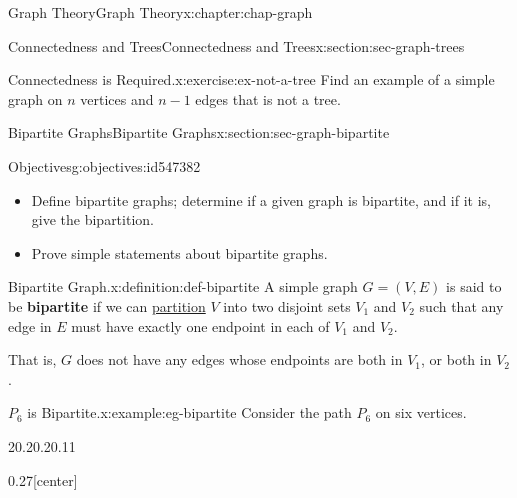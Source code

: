\documentclass[oneside,10pt,]{book}
\newcommand{\terminology}[1]{\textbf{#1}}
\numberwithin{equation}{section}
\begin{document}
\begin{chapterptx}{Graph Theory}{}{Graph Theory}{}{}{x:chapter:chap-graph}
\begin{sectionptx}{Connectedness and Trees}{}{Connectedness and Trees}{}{}{x:section:sec-graph-trees}
\begin{inlineexercise}{Connectedness is Required.}{x:exercise:ex-not-a-tree}
Find an example of a simple graph on \(n\) vertices and \(n-1\) edges that is not a tree.%
\end{inlineexercise}%
\end{sectionptx}
%
%
\typeout{************************************************}
\typeout{************************************************}
%
\begin{sectionptx}{Bipartite Graphs}{}{Bipartite Graphs}{}{}{x:section:sec-graph-bipartite}
\begin{objectives}{Objectives}{g:objectives:id547382}
%
\begin{itemize}[label=\textbullet]
\item{}Define bipartite graphs; determine if a given graph is bipartite, and if it is, give the bipartition.%
\item{}Prove simple statements about bipartite graphs.%
\end{itemize}
\end{objectives}
\begin{definition}{Bipartite Graph.}{x:definition:def-bipartite}%
A simple graph \(G = (V,E)\) is said to be \terminology{bipartite} if we can \hyperref[x:definition:def-partition]{partition} \(V\) into two disjoint sets \(V_1\) and \(V_2\) such that any edge in \(E\) must have exactly one endpoint in each of \(V_1\) and \(V_2\).%
\par
That is, \(G\) does not have any edges whose endpoints are both in \(V_1\), or both in \(V_2\).%
\end{definition}
\begin{example}{\(P_6\) is Bipartite.}{x:example:eg-bipartite}%
Consider the path \(P_6\) on six vertices.%
\begin{sidebyside}{2}{0.2}{0.2}{0.11}%
\begin{sbspanel}{0.27}[center]%
\end{sbspanel}
\end{sidebyside}
\end{example}
\end{sectionptx}
\end{chapterptx}
\end{document}
